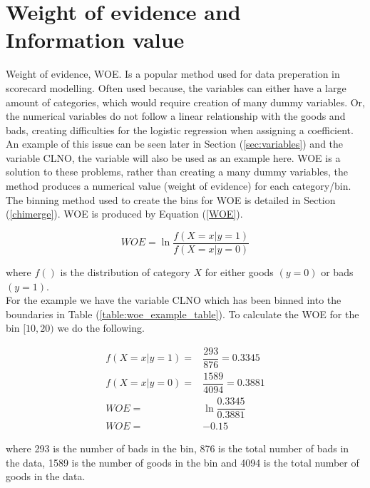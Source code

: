 \pagebreak

\section{Weight of evidence and Information value}  \label{sec:woe_and_iv}

Weight of evidence, WOE. Is a popular method used for data preperation in scorecard modelling. Often used because, the variables can either have a large amount of categories, which would require creation of many dummy variables. Or, the numerical variables do not follow a linear relationship with the goods and bads, creating difficulties for the logistic regression when assigning a coefficient. An example of this issue can be seen later in Section (\ref{sec:variables}) and the variable CLNO, the variable will also be used as an example here. WOE is a solution to these problems, rather than creating a many dummy variables, the method produces a numerical value (weight of evidence) for each category/bin. The binning method used to create the bins for WOE is detailed in Section (\ref{chimerge}). WOE is produced by Equation (\ref{WOE}). 

\begin{equation}\label{WOE}
WOE = \ln \frac{f(X=x|y=1)}{f(X=x|y=0)}
\end{equation}

where $f()$ is the distribution of category $X$ for either goods $(y=0)$ or bads $(y=1)$. \\

For the example we have the variable CLNO which has been binned into the boundaries in Table (\ref{table:woe_example_table}). To calculate the WOE for the bin $[10, 20)$ we do the following. 

\begin{equation}\label{WOE_Example}
\begin{aligned}
f(X=x|y=1) =& \dfrac{293}{876} = 0.3345 \\
f(X=x|y=0) =& \dfrac{1589}{4094} = 0.3881 \\
WOE =& \ln \dfrac{0.3345}{0.3881} \\
WOE =& -0.15
\end{aligned}
\end{equation}

where 293 is the number of bads in the bin, 876 is the total number of bads in the data, 1589 is the number of goods in the bin and 4094 is the total number of goods in the data. \\

